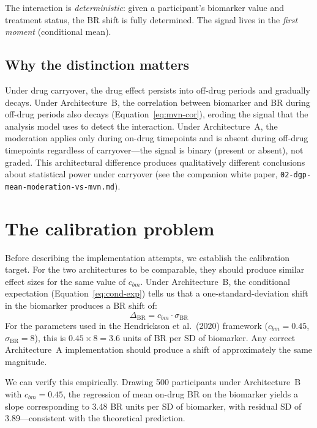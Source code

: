 \documentclass[11pt]{article}
\begin{document}
The interaction is \emph{deterministic}: given a participant's
biomarker value and treatment status, the BR shift is fully
determined. The signal lives in the \emph{first moment}
(conditional mean).

\subsection{Why the distinction matters}

Under drug carryover, the drug effect persists into off-drug
periods and gradually decays. Under Architecture~B, the
correlation between biomarker and BR during off-drug periods
also decays (Equation~\ref{eq:mvn-cor}), eroding the signal
that the analysis model uses to detect the interaction. Under
Architecture~A, the moderation applies only during on-drug
timepoints and is absent during off-drug timepoints regardless
of carryover---the signal is binary (present or absent), not
graded. This architectural difference produces qualitatively
different conclusions about statistical power under carryover
(see the companion white paper,
\texttt{02-dgp-mean-moderation-vs-mvn.md}).

\section{The calibration problem}

Before describing the implementation attempts, we establish
the calibration target. For the two architectures to be
comparable, they should produce similar effect sizes for the
same value of $c_{bm}$. Under Architecture~B, the conditional
expectation (Equation~\ref{eq:cond-exp}) tells us that a
one-standard-deviation shift in the biomarker produces a BR
shift of:
%
\begin{equation}\label{eq:target}
  \Delta_{\text{BR}} = c_{bm} \cdot \sigma_{\text{BR}}
\end{equation}
%
For the parameters used in the Hendrickson et al.\ (2020)
framework ($c_{bm} = 0.45$, $\sigma_{\text{BR}} = 8$), this
is $0.45 \times 8 = 3.6$ units of BR per SD of biomarker.
Any correct Architecture~A implementation should produce a
shift of approximately the same magnitude.

We can verify this empirically. Drawing 500 participants
under Architecture~B with $c_{bm} = 0.45$, the regression
of mean on-drug BR on the biomarker yields a slope
corresponding to 3.48 BR units per SD of biomarker, with
residual SD of 3.89---consistent with the theoretical
prediction.
\end{document}
